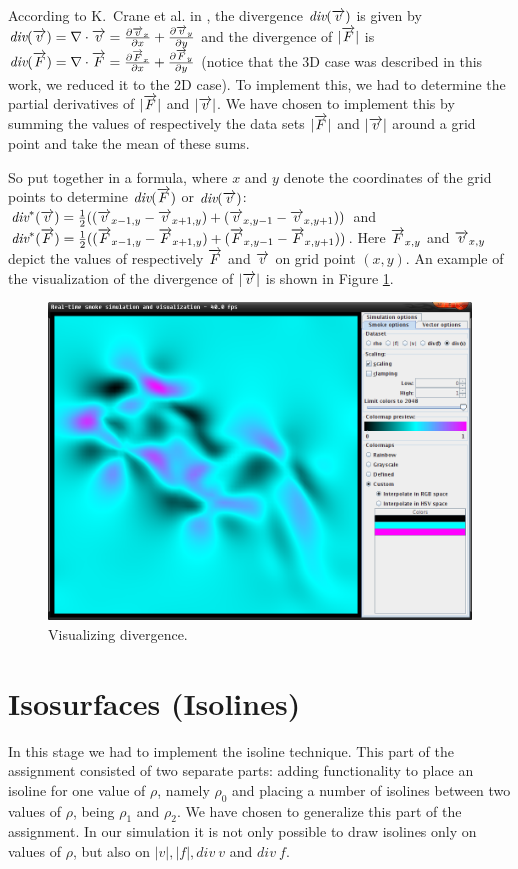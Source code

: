 \documentclass[a4paper,11pt,twoside]{report}
\begin{document}
        According to K.~Crane et al. in \cite{kcilst}, the divergence $\textit{div}(\overrightarrow{v})$ is given by $\textit{div}(\overrightarrow{v}) = \nabla \cdot \overrightarrow{v} = \frac{\partial \overrightarrow{v}_x}{\partial x} + \frac{\partial \overrightarrow{v}_y}{\partial y}$ and the divergence of $|\overrightarrow{F}|$ is $\textit{div}(\overrightarrow{F}) = \nabla \cdot \overrightarrow{F} = \frac{\partial \overrightarrow{F}_x}{\partial x} + \frac{\partial \overrightarrow{F}_y}{\partial y}$ (notice that the 3D case was described in this work, we reduced it to the 2D case). To implement this, we had to determine the partial derivatives of $|\overrightarrow{F}|$ and $|\overrightarrow{v}|$. We have chosen to implement this by summing the values of respectively the data sets $|\overrightarrow{F}|$ and $|\overrightarrow{v}|$ around a grid point and take the mean of these sums.

        So put together in a formula, where $x$ and $y$ denote the coordinates of the grid points to determine $\textit{div}(\overrightarrow{F})$ or $\textit{div}(\overrightarrow{v})$: $\textit{div}^*(\overrightarrow{v}) = \frac{1}{2}((\overrightarrow{v}_{x-1,y} - \overrightarrow{v}_{x+1,y}) + (\overrightarrow{v}_{x,y-1} - \overrightarrow{v}_{x,y+1}))$ and $\textit{div}^*(\overrightarrow{F}) = \frac{1}{2}((\overrightarrow{F}_{x-1,y} - \overrightarrow{F}_{x+1,y}) + (\overrightarrow{F}_{x,y-1} - \overrightarrow{F}_{x,y+1}))$. Here $\overrightarrow{F}_{x,y}$ and $\overrightarrow{v}_{x,y}$ depict the values of respectively $\overrightarrow{F}$ and $\overrightarrow{v}$ on grid point $(x,y)$.   An example of the visualization of the divergence of $|\overrightarrow{v}|$ is shown in Figure \ref{fig:step4}.
		\begin{figure}[h]
		\centering
		\includegraphics[scale=\imagescalefactor]{images/step4.png}
		\caption{Visualizing divergence.}\label{fig:step4}
		\end{figure}
		\clearpage
	\section{Isosurfaces (Isolines)}
        In this stage we had to implement the isoline technique. This part of the assignment consisted of two separate parts: adding functionality to place an isoline for one value of $\rho$, namely $\rho_0$ and placing a number of isolines between two values of $\rho$, being $\rho_1$ and $\rho_2$. We have chosen to generalize this part of the assignment. In our simulation it is not only possible to draw isolines only on values of $\rho$, but also on $|v|, |f|, div~v$ and $div~f$.
\end{document}
